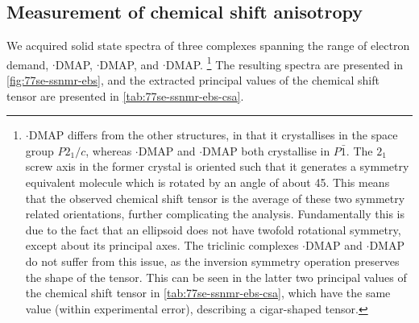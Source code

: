 \begin{refsection}
\subsection{Measurement of chemical shift anisotropy}
We acquired solid state spectra of three complexes spanning the range of electron demand, $\cdot$DMAP, $\cdot$DMAP, and $\cdot$DMAP.
\footnote{$\cdot$DMAP differs from the other structures, in that it crystallises in the space group $P2_1/c$, whereas $\cdot$DMAP and $\cdot$DMAP both crystallise in $P\bar{1}$.
The $2_1$ screw axis in the former crystal is oriented such that it generates a symmetry equivalent molecule which is rotated by an angle of about 45\degree.
This means that the observed chemical shift tensor is the average of these two symmetry related orientations, further complicating the analysis.
Fundamentally this is due to the fact that an ellipsoid does not have twofold rotational symmetry, except about its principal axes.
The triclinic complexes $\cdot$DMAP and $\cdot$DMAP do not suffer from this issue, as the inversion symmetry operation preserves the shape of the tensor.
This can be seen in the latter two principal values of the chemical shift tensor in \cref{tab:77se-ssnmr-ebs-csa}, which have the same value (within experimental error), describing a cigar-shaped tensor.}
The resulting spectra are presented in \cref{fig:77se-ssnmr-ebs}, and the extracted principal values of the chemical shift tensor are presented in \cref{tab:77se-ssnmr-ebs-csa}.


\end{refsection}
